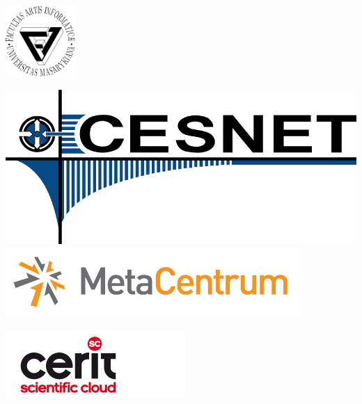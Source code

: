 \begin{frame}
	\hspace{0.7cm}
		\includegraphics[width=0.2\textwidth]{filogo.pdf}
	\hspace{1cm}
	\begin{minipage}[b]{0.3\textwidth}
		\includegraphics[width=\textwidth]{cesnet-logo-800.png}\newline
		\includegraphics[width=\textwidth]{metalogo1.png}
	\end{minipage}
	\hspace{0.4cm}
	\begin{minipage}[b]{0.3\textwidth}
	\includegraphics[width=\textwidth]{cerit-sc-logo.png}
	\vspace{1cm}
\end{minipage}
\end{frame}



